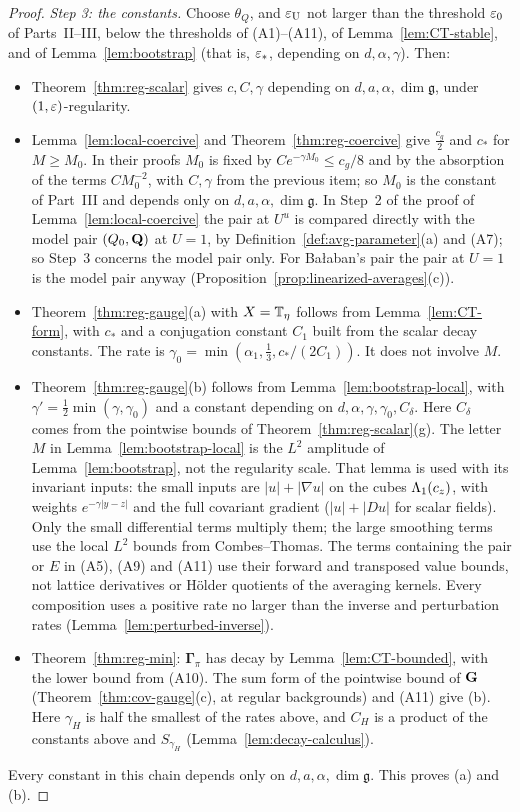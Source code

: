 \begin{proof}
\emph{Step 3: the constants.} Choose $\theta_Q$, and $\varepsilon_{\rm U}$ not larger than the threshold $\varepsilon_0$ of Parts~II--III, below the thresholds of (A1)--(A11), of Lemma~\ref{lem:CT-stable}, and of Lemma~\ref{lem:bootstrap} (that is, $\varepsilon_*$, depending on $d,\alpha,\gamma$). Then:
\begin{itemize}
\item Theorem~\ref{thm:reg-scalar} gives $c,C,\gamma$ depending on $d,a,\alpha,\dim\mathfrak g$, under $(1,\varepsilon)$-regularity.
\item Lemma~\ref{lem:local-coercive} and Theorem~\ref{thm:reg-coercive} give $\frac{c_g}2$ and $c_*$ for $M\ge M_0$. In their proofs $M_0$ is fixed by $Ce^{-\gamma M_0}\le c_g/8$ and by the absorption of the terms $CM_0^{-2}$, with $C,\gamma$ from the previous item; so $M_0$ is the constant of Part~III and depends only on $d,a,\alpha,\dim\mathfrak g$. In Step~2 of the proof of Lemma~\ref{lem:local-coercive} the pair at $U^u$ is compared directly with the model pair $(Q_0,\mathbf Q)$ at $U=1$, by Definition~\ref{def:avg-parameter}(a) and (A7); so Step~3 concerns the model pair only. For Ba\l aban's pair the pair at $U=1$ is the model pair anyway (Proposition~\ref{prop:linearized-averages}(c)).
\item Theorem~\ref{thm:reg-gauge}(a) with $X=\mathbb T_\eta$ follows from Lemma~\ref{lem:CT-form}, with $c_*$ and a conjugation constant $C_1$ built from the scalar decay constants. The rate is $\gamma_0=\min(\alpha_1,\frac13,c_*/(2C_1))$. It does not involve $M$.
\item Theorem~\ref{thm:reg-gauge}(b) follows from Lemma~\ref{lem:bootstrap-local}, with $\gamma'=\frac12\min(\gamma,\gamma_0)$ and a constant depending on $d,\alpha,\gamma,\gamma_0,C_\delta$. Here $C_\delta$ comes from the pointwise bounds of Theorem~\ref{thm:reg-scalar}(g). The letter $M$ in Lemma~\ref{lem:bootstrap-local} is the $L^2$ amplitude of Lemma~\ref{lem:bootstrap}, not the regularity scale. That lemma is used with its invariant inputs: the small inputs are $|u|+|\nabla u|$ on the cubes $\Lambda_1(c_z)$, with weights $e^{-\gamma|y-z|}$ and the full covariant gradient ($|u|+|Du|$ for scalar fields). Only the small differential terms multiply them; the large smoothing terms use the local $L^2$ bounds from Combes--Thomas. The terms containing the pair or $E$ in (A5), (A9) and (A11) use their forward and transposed value bounds, not lattice derivatives or H\"older quotients of the averaging kernels. Every composition uses a positive rate no larger than the inverse and perturbation rates (Lemma~\ref{lem:perturbed-inverse}).
\item Theorem~\ref{thm:reg-min}: $\boldsymbol\Gamma_\pi$ has decay by Lemma~\ref{lem:CT-bounded}, with the lower bound from (A10). The sum form of the pointwise bound of $\mathbf G$ (Theorem~\ref{thm:cov-gauge}(c), at regular backgrounds) and (A11) give (b). Here $\gamma_H$ is half the smallest of the rates above, and $C_H$ is a product of the constants above and $S_{\gamma_H}$ (Lemma~\ref{lem:decay-calculus}).
\end{itemize}
Every constant in this chain depends only on $d,a,\alpha,\dim\mathfrak g$. This proves (a) and (b).


\end{proof}
